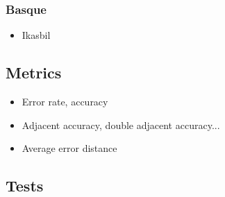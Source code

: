 \documentclass[12pt]{article}
\begin{document}
\subsubsection{Basque}
\begin{itemize}
\item Ikasbil
\end{itemize}

\subsection{Metrics}

\begin{itemize}
\item Error rate, accuracy
\item Adjacent accuracy, double adjacent accuracy...
\item Average error distance
\end{itemize}

\subsection{Tests}
\end{document}
